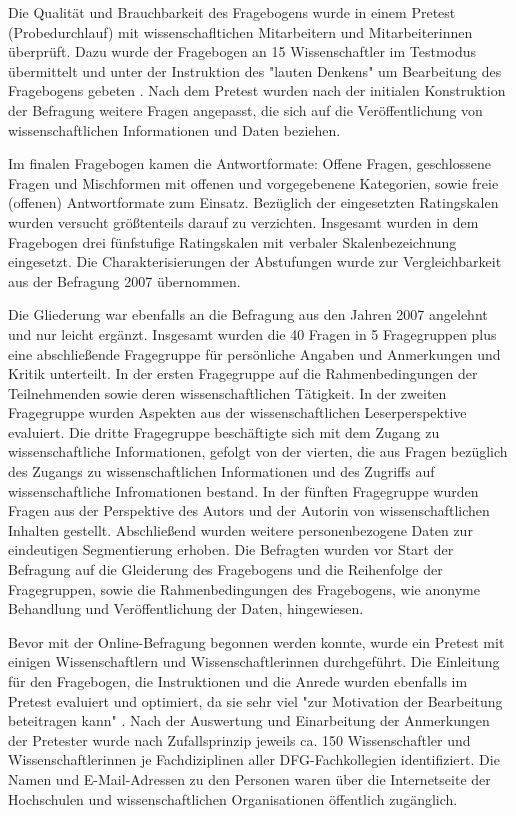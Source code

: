 Die Qualität und Brauchbarkeit des Fragebogens wurde in einem Pretest (Probedurchlauf) mit wissenschafltichen Mitarbeitern und Mitarbeiterinnen überprüft. Dazu wurde der Fragebogen an 15 Wissenschaftler im Testmodus übermittelt und unter der Instruktion des "lauten Denkens" um Bearbeitung des Fragebogens gebeten \cite{raab_2012_fragebogen}. Nach dem Pretest wurden nach der initialen Konstruktion der Befragung weitere Fragen angepasst, die sich auf die Veröffentlichung von wissenschaftlichen Informationen und Daten beziehen.

Im finalen Fragebogen kamen die Antwortformate: Offene Fragen, geschlossene Fragen und Mischformen mit offenen und vorgegebenene Kategorien, sowie freie (offenen) Antwortformate zum Einsatz. Bezüglich der eingesetzten Ratingskalen wurden versucht größtenteils darauf zu verzichten. Insgesamt wurden in dem Fragebogen drei fünfstufige Ratingskalen mit verbaler Skalenbezeichnung eingesetzt. Die Charakterisierungen der Abstufungen wurde zur Vergleichbarkeit aus der Befragung 2007 übernommen.

Die Gliederung war ebenfalls an die Befragung aus den Jahren 2007 angelehnt und nur leicht ergänzt. Insgesamt wurden die 40 Fragen in 5 Fragegruppen plus eine abschließende Fragegruppe für persönliche Angaben und Anmerkungen und Kritik unterteilt. In der ersten Fragegruppe auf die Rahmenbedingungen der Teilnehmenden sowie deren wissenschaftlichen Tätigkeit. In der zweiten Fragegruppe wurden Aspekten aus der wissenschaftlichen Leserperspektive evaluiert. Die dritte Fragegruppe beschäftigte sich mit dem Zugang zu wissenschaftliche Informationen, gefolgt von der vierten, die aus Fragen bezüglich des Zugangs zu wissenschaftlichen Informationen und des Zugriffs auf wissenschaftliche Infromationen bestand. In der fünften Fragegruppe wurden Fragen aus der Perspektive des Autors und der Autorin von wissenschaftlichen Inhalten gestellt. Abschließend wurden weitere personenbezogene Daten zur eindeutigen Segmentierung erhoben. Die Befragten wurden vor Start der Befragung auf die Gleiderung des Fragebogens und die Reihenfolge der Fragegruppen, sowie die Rahmenbedingungen des Fragebogens, wie anonyme Behandlung und Veröffentlichung der Daten, hingewiesen.

Bevor mit der Online-Befragung begonnen werden konnte, wurde ein Pretest mit einigen Wissenschaftlern und Wissenschaftlerinnen durchgeführt. Die Einleitung für den Fragebogen, die Instruktionen und die Anrede wurden ebenfalls im Pretest evaluiert und optimiert, da sie sehr viel "zur Motivation der Bearbeitung beteitragen kann" \cite{raab_2012_fragebogen}. Nach der Auswertung und Einarbeitung der Anmerkungen der Pretester wurde nach Zufallsprinzip jeweils ca. 150 Wissenschaftler und Wissenschaftlerinnen je Fachdiziplinen aller DFG-Fachkollegien identifiziert. Die Namen und E-Mail-Adressen zu den Personen waren über die Internetseite der Hochschulen und wissenschaftlichen Organisationen öffentlich zugänglich. 

